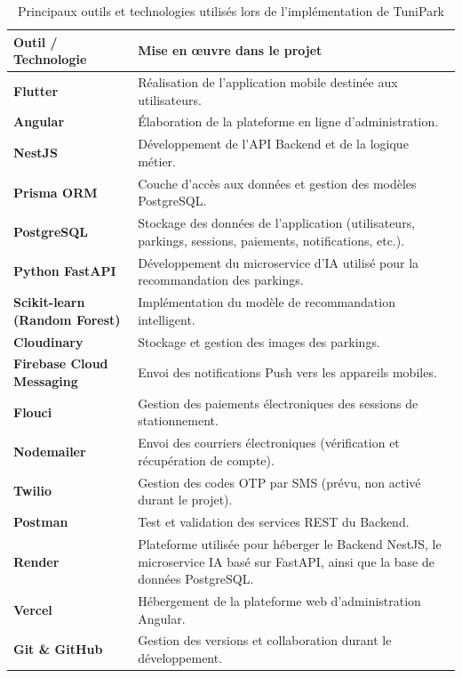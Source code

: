 \begin{table}[H]
\centering
\small
\renewcommand{\arraystretch}{1.25}
\begin{tabular}{|p{}|p{}|}
\hline
\textbf{Outil / Technologie} & \textbf{Mise en œuvre dans le projet} \\
\hline
\textbf{Flutter} & Réalisation de l'application mobile destinée aux utilisateurs. \\
\hline
\textbf{Angular} & Élaboration de la plateforme en ligne d'administration. \\
\hline
\textbf{NestJS} & Développement de l'API Backend et de la logique métier. \\
\hline
\textbf{Prisma ORM} & Couche d'accès aux données et gestion des modèles PostgreSQL. \\
\hline
\textbf{PostgreSQL} & Stockage des données de l'application (utilisateurs, parkings, sessions, paiements, notifications, etc.). \\
\hline
\textbf{Python FastAPI} & Développement du microservice d'IA utilisé pour la recommandation des parkings. \\
\hline
\textbf{Scikit-learn (Random Forest)} & Implémentation du modèle de recommandation intelligent. \\
\hline
\textbf{Cloudinary} & Stockage et gestion des images des parkings. \\
\hline
\textbf{Firebase Cloud Messaging} & Envoi des notifications Push vers les appareils mobiles. \\
\hline
\textbf{Flouci} & Gestion des paiements électroniques des sessions de stationnement. \\
\hline
\textbf{Nodemailer} & Envoi des courriers électroniques (vérification et récupération de compte). \\
\hline
\textbf{Twilio} & Gestion des codes OTP par SMS (prévu, non activé durant le projet). \\
\hline
\textbf{Postman} & Test et validation des services REST du Backend. \\
\hline
\textbf{Render} & Plateforme utilisée pour héberger le Backend NestJS, le microservice IA basé sur FastAPI, ainsi que la base de données PostgreSQL. \\
\hline
\textbf{Vercel} & Hébergement de la plateforme web d'administration Angular. \\
\hline
\textbf{Git \& GitHub} & Gestion des versions et collaboration durant le développement. \\
\hline
\end{tabular}
\caption{Principaux outils et technologies utilisés lors de l'implémentation de TuniPark}
\label{tab:implementation_tools}
\end{table}

